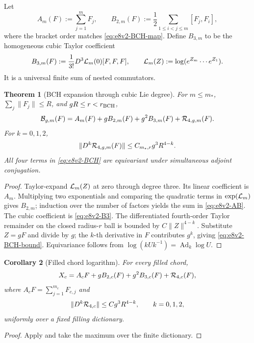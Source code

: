 \documentclass[11pt,oneside]{book}
\newtheorem{theorem}{Theorem}[chapter]
\newtheorem{corollary}[theorem]{Corollary}
\theoremstyle{definition}
\theoremstyle{remark}
\begin{document}
Let
\[
 A_m(F):=\sum_{j=1}^mF_j,\qquad
 B_{2,m}(F):=\frac12\sum_{1\leq i<j\leq m}[F_j,F_i],
                                                        \label{eq:e8v2-AB}
\]
where the bracket order matches
\eqref{eq:e8v2-BCH-map}.  Define \(B_{3,m}\) to be the homogeneous
cubic Taylor coefficient
\[
 B_{3,m}(F):=
 \frac1{3!}
 D^3{\cal L}_m(0)[F,F,F],\qquad
 {\cal L}_m(Z):=\log(e^{Z_m}\cdots e^{Z_1}).          \label{eq:e8v2-B3}
\]
It is a universal finite sum of nested commutators.

\begin{theorem}[BCH expansion through cubic Lie degree]
\label{thm:e8v2-BCH}
For \(m\leq m_*\), \(\sum_j\|F_j\|\leq R\), and
\(gR\leq r<r_{\rm BCH}\),
\[
 {\cal B}_{g,m}(F)
 =
 A_m(F)+gB_{2,m}(F)+g^2B_{3,m}(F)
 +{\cal R}_{4,g,m}(F).                               \label{eq:e8v2-BCH}
\]
For \(k=0,1,2\),
\[
 \|D^k{\cal R}_{4,g,m}(F)\|
 \leq C_{m_*,r}g^3R^{4-k}.                           \label{eq:e8v2-BCH-bound}
\]
All four terms in \eqref{eq:e8v2-BCH} are equivariant under
simultaneous adjoint conjugation.
\end{theorem}

\begin{proof}
Taylor-expand \({\cal L}_m(Z)\) at zero through degree three.
Its linear coefficient is \(A_m\).  Multiplying two exponentials and
comparing the quadratic terms in
\(\exp({\cal L}_m)\) gives \(B_{2,m}\); induction over the number of
factors yields the sum in \eqref{eq:e8v2-AB}.  The cubic coefficient is
\eqref{eq:e8v2-B3}.  The differentiated fourth-order Taylor remainder
on the closed radius-\(r\) ball is bounded by
\(C\|Z\|^{4-k}\).  Substitute \(Z=gF\) and divide by \(g\);
the \(k\)-th derivative in \(F\) contributes \(g^k\), giving
\eqref{eq:e8v2-BCH-bound}.  Equivariance follows from
\(\log(kUk^{-1})=\operatorname{Ad}_k\log U\).
\end{proof}

\begin{corollary}[Filled chord logarithm]
\label{cor:e8v2-chord}
For every filled chord,
\[
 X_c=A_cF+gB_{2,c}(F)+g^2B_{3,c}(F)
 +{\cal R}_{4,c}(F),                                \label{eq:e8v2-chord}
\]
where \(A_cF=\sum_{j=1}^{m_c}F_{c,j}\) and
\[
 \|D^k{\cal R}_{4,c}\|
 \leq Cg^3R^{4-k},\qquad k=0,1,2,                   \label{eq:e8v2-chord-bound}
\]
uniformly over a fixed filling dictionary.
\end{corollary}

\begin{proof}
Apply  and take the maximum over
the finite dictionary.
\end{proof}
\end{document}
